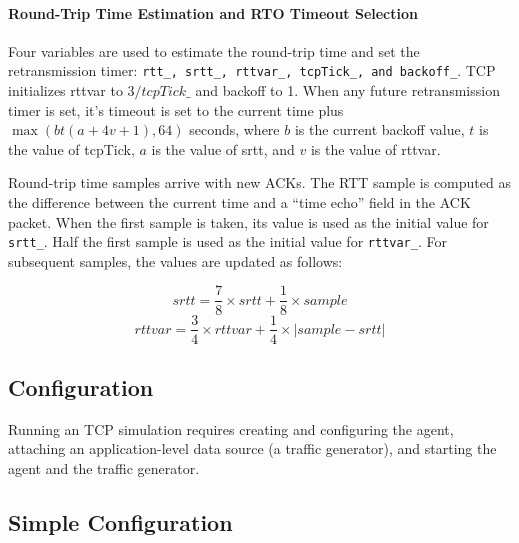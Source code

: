 \paragraph{Round-Trip Time Estimation and RTO Timeout Selection}
Four variables are used to estimate the round-trip time and
set the retransmission timer: {\tt rtt\_, srtt\_, rttvar\_, tcpTick\_,
and backoff\_}.
TCP initializes rttvar to $3/tcpTick\_$ and backoff to 1.
When any future retransmission timer is set, it's timeout
is set to the current time plus $\max(bt(a+4v+1), 64)$ seconds,
where $b$ is the current backoff value, $t$ is the value of tcpTick,
$a$ is the value of srtt, and $v$ is the value of rttvar.

Round-trip time samples arrive with new ACKs.
The RTT sample is computed as the difference between the current
time and a ``time echo'' field in the ACK packet.
When the first sample is taken, its value is used as the initial
value for {\tt srtt\_}.  Half the first sample is used as the initial
value for {\tt rttvar\_}.
For subsequent samples, the values are updated as follows:

\[ srtt = \frac{7}{8} \times srtt + \frac{1}{8} \times sample \]
\[ rttvar = \frac{3}{4} \times rttvar + \frac{1}{4} \times |sample-srtt| \]

\subsection{Configuration}
\label{sec:tcp-config}

Running an TCP simulation requires
creating and configuring the agent,
attaching an application-level data source (a traffic generator), and
starting the agent and the traffic generator.

\subsection{Simple Configuration}

